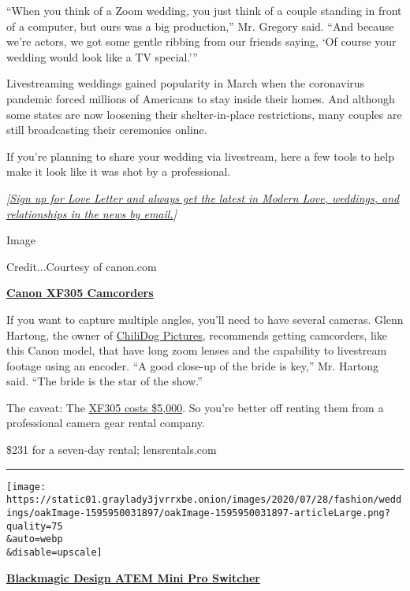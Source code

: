 ``When you think of a Zoom wedding, you just think of a couple standing
in front of a computer, but ours was a big production,'' Mr. Gregory
said. ``And because we're actors, we got some gentle ribbing from our
friends saying, `Of course your wedding would look like a TV special.'''

Livestreaming weddings gained popularity in March when the coronavirus
pandemic forced millions of Americans to stay inside their homes. And
although some states are now loosening their shelter-in-place
restrictions, many couples are still broadcasting their ceremonies
online.

If you're planning to share your wedding via livestream, here a few
tools to help make it look like it was shot by a professional.

\emph{{[}}\href{https://www.nytimes3xbfgragh.onion/newsletters/love-letter?module=inline}{\emph{Sign
up for Love Letter and always get the latest in Modern Love, weddings,
and relationships in the news by email.}}\emph{{]}}

Image

Credit...Courtesy of canon.com

\textbf{\href{https://www.lensrentals.com/rent/canon-xf305}{Canon XF305
Camcorders}}

If you want to capture multiple angles, you'll need to have several
cameras. Glenn Hartong, the owner of
\href{https://www.chilidogpictures.com/}{ChiliDog Pictures}, recommends
getting camcorders, like this Canon model, that have long zoom lenses
and the capability to livestream footage using an encoder. ``A good
close-up of the bride is key,'' Mr. Hartong said. ``The bride is the
star of the show.''

The caveat: The
\href{https://www.usa.canon.com/internet/portal/us/home/products/details/camcorders/professional/xf305}{XF305
costs \$5,000}. So you're better off renting them from a professional
camera gear rental company.

\$231 for a seven-day rental; lensrentals.com

\begin{center}\rule{0.5\linewidth}{\linethickness}\end{center}

\texttt{[image: https://static01.graylady3jvrrxbe.onion/images/2020/07/28/fashion/weddings/oakImage-1595950031897/oakImage-1595950031897-articleLarge.png?quality=75\\\&auto=webp\\\&disable=upscale]}

\textbf{\href{https://www.blackmagicdesign.com/products/atemmini/techspecs/W-APS-14}{Blackmagic
Design ATEM Mini Pro Switcher}}

